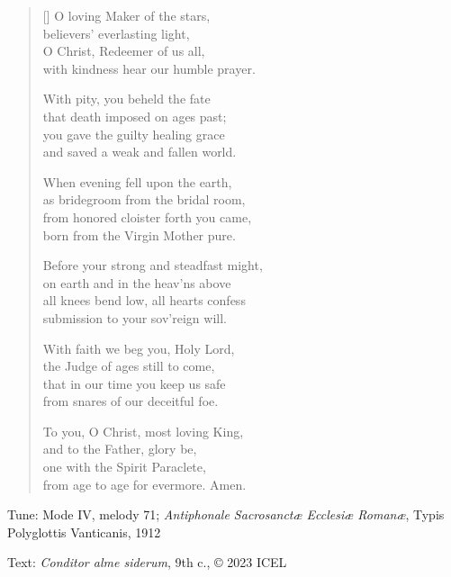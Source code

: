 \hymn

\settowidth{\versewidth}{Before your strong and steadfast might,}

\begin{verse}[\versewidth]
O loving Maker of the stars,\\
believers’ everlasting light,\\
O Christ, Redeemer of us all,\\
with kindness hear our humble prayer.

With pity, you beheld the fate\\
that death imposed on ages past;\\
you gave the guilty healing grace\\
and saved a weak and fallen world.

When evening fell upon the earth,\\
as bridegroom from the bridal room,\\
from honored cloister forth you came,\\
born from the Virgin Mother pure.

Before your strong and steadfast might,\\
on earth and in the heav’ns above\\
all knees bend low, all hearts confess\\
submission to your sov’reign will.

With faith we beg you, Holy Lord,\\
the Judge of ages still to come,\\
that in our time you keep us safe\\
from snares of our deceitful foe.

To you, O Christ, most loving King,\\
and to the Father, glory be,\\
one with the Spirit Paraclete,\\
from age to age for evermore. Amen.
\end{verse}

\begin{hymnsource}
Tune: Mode IV, melody 71; \emph{Antiphonale Sacrosanctæ Ecclesiæ Romanæ}, Typis Polyglottis Vanticanis, 1912

Text: \emph{Conditor alme siderum}, 9th c., © 2023 ICEL
\end{hymnsource}